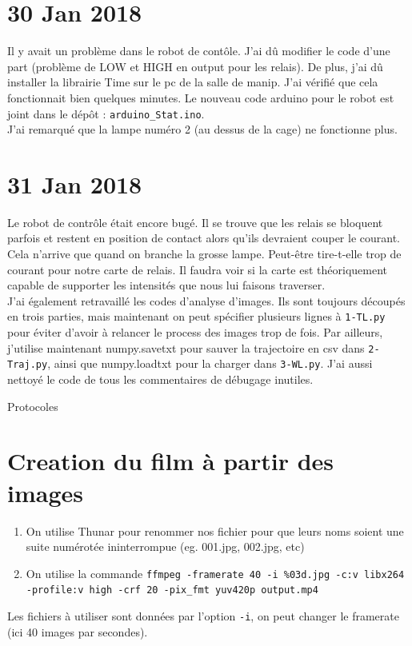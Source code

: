\documentclass[10pt,a4paper]{article}
\begin{document}
\section{30 Jan 2018}

Il y avait un problème dans le robot de contôle. J'ai dû modifier le code d'une part (problème de LOW et HIGH en output pour les relais). De plus, j'ai dû installer la librairie Time sur le pc de la salle de manip. J'ai vérifié que cela fonctionnait bien quelques minutes. Le nouveau code arduino pour le robot est joint dans le dépôt : \texttt{arduino\_Stat.ino}.\\

J'ai remarqué que la lampe numéro 2 (au dessus de la cage) ne fonctionne plus.

\section{31 Jan 2018}
Le robot de contrôle était encore bugé. Il se trouve que les relais se bloquent parfois et restent en position de contact alors qu'ils devraient couper le courant. Cela n'arrive que quand on branche la grosse lampe. Peut-être tire-t-elle trop de courant pour notre carte de relais. Il faudra voir si la carte est théoriquement capable de supporter les intensités que nous lui faisons traverser.\\

J'ai également retravaillé les codes d'analyse d'images. Ils sont toujours découpés en trois parties, mais maintenant on peut spécifier plusieurs lignes à \texttt{1-TL.py} pour éviter d'avoir à relancer le process des images trop de fois. Par ailleurs, j'utilise maintenant numpy.savetxt pour sauver la trajectoire en csv dans \texttt{2-Traj.py}, ainsi que numpy.loadtxt pour la charger dans \texttt{3-WL.py}. J'ai aussi nettoyé le code de tous les commentaires de débugage inutiles.





\newpage
\begin{center}
        {\Huge Protocoles}
\end{center}
\appendix

\section{Creation du film à partir des images\label{film}}
\begin{enumerate}
        \item On utilise Thunar pour renommer nos fichier pour que leurs noms soient une suite numérotée ininterrompue (eg. 001.jpg, 002.jpg, etc)
        \item On utilise la commande \texttt{ffmpeg -framerate 40 -i \%03d.jpg -c:v libx264 -profile:v high -crf 20 -pix\_fmt yuv420p output.mp4}
\end{enumerate}
Les fichiers à utiliser sont données par l'option \texttt{-i}, on peut changer le framerate (ici 40 images par secondes).
\end{document}
